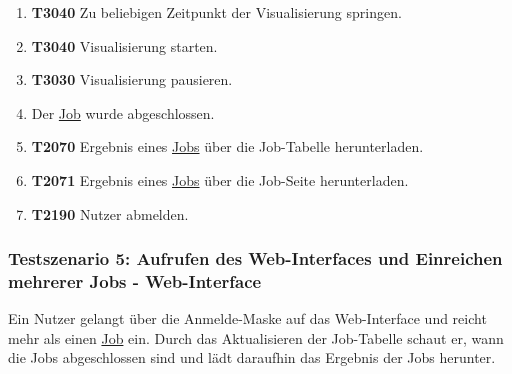 \begin{enumerate}
    \item \textbf{T3040} Zu beliebigen Zeitpunkt der Visualisierung springen.
    
    \item \textbf{T3040} Visualisierung starten. 
    
    \item \textbf{T3030} Visualisierung pausieren.
    
    \item Der \hyperref[B:Jobs]{Job} wurde abgeschlossen.
    
    \item \textbf{T2070} Ergebnis eines \hyperref[B:Jobs]{Jobs} über die Job-Tabelle herunterladen.
        
    \item \textbf{T2071} Ergebnis eines \hyperref[B:Jobs]{Jobs} über die Job-Seite herunterladen. 
    
    \item \textbf{T2190} \gls{Nutzer} abmelden.

\end{enumerate}

\subsubsection{Testszenario 5: Aufrufen des Web-Interfaces und Einreichen mehrerer Jobs - Web-Interface}
Ein \gls{Nutzer} gelangt über die Anmelde-Maske auf das \gls{Web-Interface} und reicht mehr als einen \hyperref[B:Jobs]{Job} ein. Durch das Aktualisieren der Job-Tabelle schaut er, wann die Jobs abgeschlossen sind und lädt daraufhin das Ergebnis der Jobs herunter.

